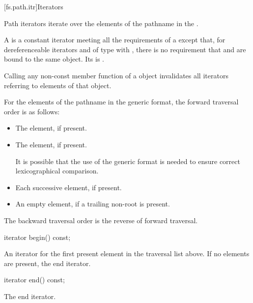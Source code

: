 [fs.path.itr]{Iterators}

%
\pnum
Path iterators iterate over the elements of the pathname
in the .

\pnum
A  is a constant iterator meeting all the
requirements of a 
except that,
for dereferenceable iterators  and 
of type 
with ,
there is no requirement that  and 
are bound to the same object.
Its  is .

\pnum
Calling any non-const member function of a  object
invalidates all iterators referring to elements of that object.

\pnum
For the elements of the pathname in the generic format,
the forward traversal order is as follows:
\begin{itemize}
\item The  element, if present.
\item The  element, if present.
\begin{note}
It is possible that the use of the generic format is needed
to ensure correct lexicographical comparison.
\end{note}
\item Each successive  element, if present.
\item An empty element, if a trailing non-root 
is present.
\end{itemize}

\pnum
The backward traversal order is the reverse of forward traversal.

%
\begin{itemdecl}
iterator begin() const;
\end{itemdecl}

\begin{itemdescr}
\pnum
\returns
An iterator for the first present element in the traversal
list above. If no elements are present, the end iterator.
\end{itemdescr}

%
\begin{itemdecl}
iterator end() const;
\end{itemdecl}

\begin{itemdescr}
\pnum
\returns
The end iterator.
\end{itemdescr}


